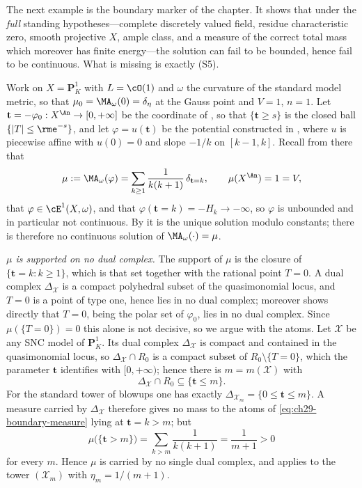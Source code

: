 The next example is the boundary marker of the chapter.  It shows that under
the \emph{full} standing hypotheses---complete discretely valued field,
residue characteristic zero, smooth projective \(X\), ample class, and a
measure of the correct total mass which moreover has finite energy---the
solution can fail to be bounded, hence fail to be continuous.  What is
missing is exactly \textup{(S5)}.

\begin{example}
\label{ex:ch29-unbounded-not-supported}
Work on \(X=\mathbf P^1_K\) with \(L=\cO(1)\) and \(\omega\) the curvature
of the standard model metric, so that \(\mu_0=\MA_\omega(0)=\delta_\eta\) at
the Gauss point and \(V=1\), \(n=1\).  Let
\(\mathbf t=-\varphi_0:X^{\An}\to[0,+\infty]\) be the coordinate of
, so that \(\{\mathbf t\geq s\}\) is the
closed ball \(\{|T|\leq\rme^{-s}\}\), and let \(\varphi=u(\mathbf t)\) be
the potential constructed in , where
\(u\) is piecewise affine with \(u(0)=0\) and slope \(-1/k\) on
\([k-1,k]\).  Recall from there that
\begin{equation}
\label{eq:ch29-boundary-measure}
 \mu:=\MA_\omega(\varphi)
 =\sum_{k\geq1}\frac1{k(k+1)}\,\delta_{\mathbf t=k},
 \qquad \mu(X^{\An})=1=V,
\end{equation}
that \(\varphi\in\cE^1(X,\omega)\), and that
\(\varphi(\mathbf t=k)=-H_k\to-\infty\), so \(\varphi\) is unbounded and in
particular not continuous.  By  it is the unique
solution modulo constants; there is therefore no continuous solution of
\(\MA_\omega(\cdot)=\mu\).

\emph{\(\mu\) is supported on no dual complex.}  The support of \(\mu\) is
the closure of \(\{\mathbf t=k:k\geq1\}\), which is that set together with
the rational point \(T=0\).  A dual complex \(\Delta_{\mathcal X}\) is a
compact polyhedral subset of the quasimonomial locus, and \(T=0\) is a point
of type one, hence lies in no dual complex; moreover
 shows directly that
\(T=0\), being the polar set of \(\varphi_0\), lies in no dual complex.
Since \(\mu(\{T=0\})=0\) this alone is not decisive, so we argue with the
atoms.  Let \(\mathcal X\) be any SNC model of \(\mathbf P^1_K\).  Its dual
complex \(\Delta_{\mathcal X}\) is compact and contained in the
quasimonomial locus, so
\(\Delta_{\mathcal X}\cap R_0\) is a compact subset of
\(R_0\setminus\{T=0\}\), which the parameter \(\mathbf t\) identifies with
\([0,+\infty)\); hence there is \(m=m(\mathcal X)\) with
\[
 \Delta_{\mathcal X}\cap R_0\subseteq\{\mathbf t\leq m\} .
\]
For the standard tower of blowups one has exactly
\(\Delta_{\mathcal X_m}=\{0\leq\mathbf t\leq m\}\).  A measure carried by
\(\Delta_{\mathcal X}\) therefore gives no mass to the atoms of
\eqref{eq:ch29-boundary-measure} lying at \(\mathbf t=k>m\); but
\[
 \mu\bigl(\{\mathbf t>m\}\bigr)=\sum_{k>m}\frac1{k(k+1)}
 =\frac1{m+1}>0
\]
for every \(m\).  Hence \(\mu\) is carried by no single dual complex, and
 applies to the tower
\((\mathcal X_m)\) with \(\eta_m=1/(m+1)\).


\end{example}
